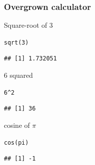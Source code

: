 \documentclass[color=usenames,dvipsnames]{beamer}\usepackage[]{graphicx}\usepackage[]{color}
\makeatletter
\newcommand{\hlnum}[1]{\textcolor[rgb]{0.69,0.494,0}{#1}}%
\newcommand{\hlopt}[1]{\textcolor[rgb]{0,0,0}{#1}}%
\newcommand{\hlstd}[1]{\textcolor[rgb]{0,0,0}{#1}}%
\newcommand{\hlkwd}[1]{\textcolor[rgb]{0.004,0.004,0.506}{#1}}%
\newenvironment{kframe}{%
 \def\at@end@of@kframe{}%
 \ifinner\ifhmode%
  \def\at@end@of@kframe{\end{minipage}}%
  \begin{minipage}{\columnwidth}%
 \fi\fi%
 \def\FrameCommand##1{\hskip\@totalleftmargin \hskip-\fboxsep
 \colorbox{shadecolor}{##1}\hskip-\fboxsep
     \hskip-\linewidth \hskip-\@totalleftmargin \hskip\columnwidth}%
 \MakeFramed {\advance\hsize-\width
   \@totalleftmargin\z@ \linewidth\hsize
   \@setminipage}}%
 {\par\unskip\endMakeFramed%
 \at@end@of@kframe}
\newenvironment{knitrout}{}{} %
\makeatother
\begin{document}
\begin{frame}[fragile]
  \frametitle{Overgrown calculator}
  \small
  Square-root of 3
\begin{knitrout}\small
{}\color{fgcolor}\begin{kframe}
\begin{alltt}
\hlkwd{sqrt}\hlstd{(}\hlnum{3}\hlstd{)}
\end{alltt}
\begin{verbatim}
## [1] 1.732051
\end{verbatim}
\end{kframe}
\end{knitrout}
\pause \vfill
  6 squared
\begin{knitrout}\small
{}\color{fgcolor}\begin{kframe}
\begin{alltt}
\hlnum{6}\hlopt{^}\hlnum{2}
\end{alltt}
\begin{verbatim}
## [1] 36
\end{verbatim}
\end{kframe}
\end{knitrout}
\pause \vfill
  cosine of $\pi$
\begin{knitrout}\small
{}\color{fgcolor}\begin{kframe}
\begin{alltt}
\hlkwd{cos}\hlstd{(pi)}
\end{alltt}
\begin{verbatim}
## [1] -1
\end{verbatim}
\end{kframe}
\end{knitrout}
\end{frame}





\end{document}
